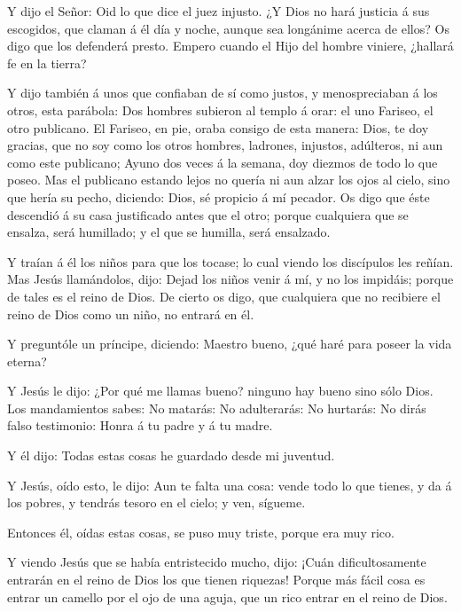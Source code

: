  Y dijo el Señor: Oid lo que dice el juez injusto.
 ¿Y Dios no hará justicia á sus escogidos, que claman á él
día y noche, aunque sea longánime acerca de ellos?  Os digo
que los defenderá presto. Empero cuando el Hijo del hombre viniere,
¿hallará fe en la tierra?

 Y dijo también á unos que confiaban de sí como justos, y
menospreciaban á los otros, esta parábola:  Dos hombres
subieron al templo á orar: el uno Fariseo, el otro publicano.
 El Fariseo, en pie, oraba consigo de esta manera: Dios, te
doy gracias, que no soy como los otros hombres, ladrones, injustos,
adúlteros, ni aun como este publicano;  Ayuno dos veces á
la semana, doy diezmos de todo lo que poseo.  Mas el
publicano estando lejos no quería ni aun alzar los ojos al cielo, sino
que hería su pecho, diciendo: Dios, sé propicio á mí pecador.
 Os digo que éste descendió á su casa justificado antes que
el otro; porque cualquiera que se ensalza, será humillado; y el que se
humilla, será ensalzado.

 Y traían á él los niños para que los tocase; lo cual
viendo los discípulos les reñían.  Mas Jesús llamándolos,
dijo: Dejad los niños venir á mí, y no los impidáis; porque de tales es
el reino de Dios.  De cierto os digo, que cualquiera que no
recibiere el reino de Dios como un niño, no entrará en él.

 Y preguntóle un príncipe, diciendo: Maestro bueno, ¿qué
haré para poseer la vida eterna?

 Y Jesús le dijo: ¿Por qué me llamas bueno? ninguno hay
bueno sino sólo Dios.  Los mandamientos sabes: No matarás:
No adulterarás: No hurtarás: No dirás falso testimonio: Honra á tu padre
y á tu madre.

 Y él dijo: Todas estas cosas he guardado desde mi
juventud.

 Y Jesús, oído esto, le dijo: Aun te falta una cosa: vende
todo lo que tienes, y da á los pobres, y tendrás tesoro en el cielo; y
ven, sígueme.

 Entonces él, oídas estas cosas, se puso muy triste, porque
era muy rico.

 Y viendo Jesús que se había entristecido mucho, dijo:
¡Cuán dificultosamente entrarán en el reino de Dios los que tienen
riquezas!  Porque más fácil cosa es entrar un camello por
el ojo de una aguja, que un rico entrar en el reino de Dios.

